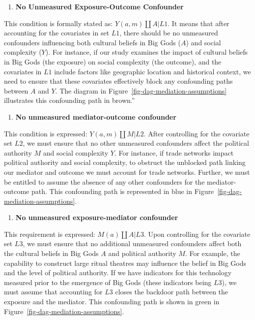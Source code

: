 \documentclass[
  singlecolumn,
  9pt]{article}
\providecommand{\tightlist}{%
  \setlength{\itemsep}{0pt}\setlength{\parskip}{0pt}}\usepackage{longtable,booktabs,array}
\begin{document}
\begin{enumerate}
\def\labelenumi{\arabic{enumi}.}
\tightlist
\item
  \textbf{No Unmeasured Exposure-Outcome Confounder}
\end{enumerate}

This condition is formally stated as: \(Y(a,m) \coprod A | L1\). It
means that after accounting for the covariates in set \(L1\), there
should be no unmeasured confounders influencing both cultural beliefs in
Big Gods (\(A\)) and social complexity (\(Y\)). For instance, if our
study examines the impact of cultural beliefs in Big Gods (the exposure)
on social complexity (the outcome), and the covariates in \(L1\) include
factors like geographic location and historical context, we need to
ensure that these covariates effectively block any confounding paths
between \(A\) and \(Y\). The diagram in
Figure~\ref{fig-dag-mediation-assumptions} illustrates this confounding
path in brown.''

\begin{enumerate}
\def\labelenumi{\arabic{enumi}.}
\setcounter{enumi}{1}
\tightlist
\item
  \textbf{No unmeasured mediator-outcome confounder}
\end{enumerate}

This condition is expressed: \(Y(a,m) \coprod M | L2\). After
controlling for the covariate set \(L2\), we must ensure that no other
unmeasured confounders affect the political authority \(M\) and social
complexity \(Y\). For instance, if trade networks impact political
authority and social complexity, to obstruct the unblocked path linking
our mediator and outcome we must account for trade networks. Further, we
must be entitled to assume the absence of any other confounders for the
mediator-outcome path. This confounding path is represented in blue in
Figure~\ref{fig-dag-mediation-assumptions}.

\begin{enumerate}
\def\labelenumi{\arabic{enumi}.}
\setcounter{enumi}{2}
\tightlist
\item
  \textbf{No unmeasured exposure-mediator confounder}
\end{enumerate}

This requirement is expressed: \(M(a) \coprod A | L3\). Upon controlling
for the covariate set \(L3\), we must ensure that no additional
unmeasured confounders affect both the cultural beliefs in Big Gods
\(A\) and political authority \(M\). For example, the capability to
construct large ritual theatres may influence the belief in Big Gods and
the level of political authority. If we have indicators for this
technology measured prior to the emergence of Big Gods (these indicators
being \(L3\)), we must assume that accounting for \(L3\) closes the
backdoor path between the exposure and the mediator. This confounding
path is shown in green in Figure~\ref{fig-dag-mediation-assumptions}.
\end{document}

